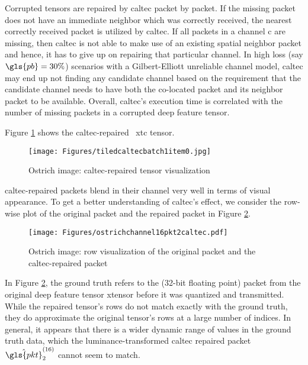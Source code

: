 Corrupted tensors are repaired by \gls{caltec} packet by packet. If the missing packet does not have an immediate neighbor which was correctly received, the nearest correctly received packet is utilized by \gls{caltec}. If all packets in a channel \gls{c} are missing, then \gls{caltec} is not able to make use of an existing spatial neighbor packet and hence, it has to give up on repairing that particular channel. In high loss (say $\gls{pb}=30\%$) scenarios with a Gilbert-Elliott unreliable channel model, \gls{caltec} may end up not finding any candidate channel based on the requirement that the candidate channel needs to have both the co-located packet and its neighbor packet to be available. Overall, \gls{caltec}'s execution time is correlated with the number of missing packets in a corrupted deep feature tensor.

Figure \ref{fig:caltec:ostrich:repaired} shows the \gls{caltec}-repaired \addone~\gls{xtc} tensor.

\begin{figure}[H]
	\centering
	\texttt{[image: Figures/tiledcaltecbatch1item0.jpg]}
	\caption[Ostrich image: CALTeC repaired tensor visualization]{Ostrich image: \gls{caltec}-repaired tensor visualization}
	\label{fig:caltec:ostrich:repaired}
\end{figure}

\gls{caltec}-repaired packets blend in their channel very well in terms of visual appearance. To get a better understanding of \gls{caltec}'s effect, we consider the row-wise plot of the original packet and the repaired packet in Figure \ref{fig:caltec:rowvis}.

\begin{figure}[H]
	\centering
	\texttt{[image: Figures/ostrichchannel16pkt2caltec.pdf]}
	\caption[Ostrich image: row visualization of original packet and completed packet]{Ostrich image: row visualization of the original packet and the \gls{caltec}-repaired packet}
	\label{fig:caltec:rowvis}
\end{figure}

In Figure \ref{fig:caltec:rowvis}, the ground truth refers to the (32-bit floating point) packet from the original deep feature tensor \gls{xtensor} before it was quantized and transmitted. While the repaired tensor's rows do not match exactly with the ground truth, they do approximate the original tensor's rows at a large number of indices. In general, it appears that there is a wider dynamic range of values in the ground truth data, which the luminance-transformed \gls{caltec} repaired packet $\hat{\gls{pkt}}_2^{(16)}$ cannot seem to match. 

